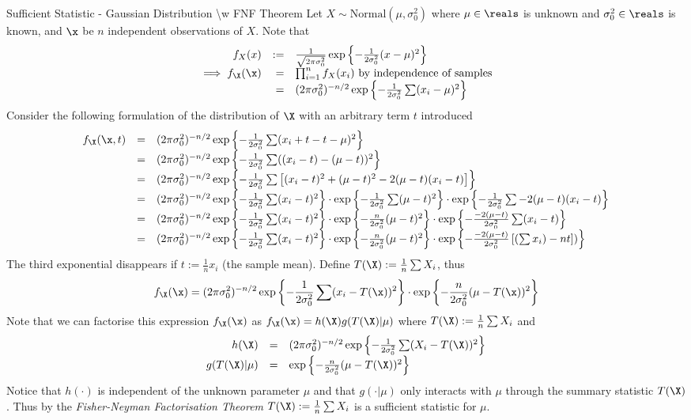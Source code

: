 \documentclass[11pt,a4paper]{article}
\begin{document}
  \begin{example}{Sufficient Statistic - Gaussian Distribution {\textbackslash}w FNF Theorem}
    Let $X\sim\text{Normal}(\mu,\sigma^2_0)$ where $\mu\in\reals$ is unknown and $\sigma^2_0\in\reals$ is known, and $\x$ be $n$ independent observations of $X$. Note that
    \[\begin{array}{rrl}
      f_X(x)&:=&\frac1{\sqrt{2\pi\sigma^2_0}}\exp\left\{-\frac1{2\sigma_0^2}(x-\mu)^2\right\}\\
      \implies f_\X(\x)&=&\prod_{i=1}^nf_X(x_i)\text{ by independence of samples}\\
      &=&(2\pi\sigma_0^2)^{-n/2}\exp\left\{-\frac1{2\sigma_0^2}\sum(x_i-\mu)^2\right\}
    \end{array}\]
    Consider the following formulation of the distribution of $\X$ with an arbitrary term $t$ introduced
    \[\begin{array}{rcl}
      f_\X(\x,t)&=&(2\pi\sigma_0^2)^{-n/2}\exp\left\{-\frac1{2\sigma_0^2}\sum(x_i+t-t-\mu)^2\right\}\\
      &=&(2\pi\sigma_0^2)^{-n/2}\exp\left\{-\frac1{2\sigma_0^2}\sum((x_i-t)-(\mu-t))^2\right\}\\
      &=&(2\pi\sigma_0^2)^{-n/2}\exp\left\{-\frac1{2\sigma_0^2}\sum\left[(x_i-t)^2+(\mu-t)^2-2(\mu-t)(x_i-t)\right]\right\}\\
      &=&(2\pi\sigma_0^2)^{-n/2}\exp\left\{-\frac1{2\sigma_0^2}\sum(x_i-t)^2\right\}\cdot\exp\left\{-\frac1{2\sigma_0^2}\sum(\mu-t)^2\right\}\cdot\exp\left\{-\frac1{2\sigma_0^2}\sum-2(\mu-t)(x_i-t)\right\}\\
      &=&(2\pi\sigma_0^2)^{-n/2}\exp\left\{-\frac1{2\sigma_0^2}\sum(x_i-t)^2\right\}\cdot\exp\left\{-\frac{n}{2\sigma_0^2}(\mu-t)^2\right\}\cdot\exp\left\{-\frac{-2(\mu-t)}{2\sigma_0^2}\sum(x_i-t)\right\}\\
      &=&(2\pi\sigma_0^2)^{-n/2}\exp\left\{-\frac1{2\sigma_0^2}\sum(x_i-t)^2\right\}\cdot\exp\left\{-\frac{n}{2\sigma_0^2}(\mu-t)^2\right\}\cdot\exp\left\{-\frac{-2(\mu-t)}{2\sigma_0^2}\left[\left(\sum x_i\right)-nt\right])\right\}\\
    \end{array}\]
    The third exponential disappears if $t:=\frac1nx_i$ (the sample mean). Define $T(\X):=\frac1n\sum X_i$, thus
    \[ f_\X(\x)=(2\pi\sigma_0^2)^{-n/2}\exp\left\{-\frac1{2\sigma_0^2}\sum(x_i-T(\x))^2\right\}\cdot\exp\left\{-\frac{n}{2\sigma_0^2}(\mu-T(\x))^2\right\} \]
    Note that we can factorise this expression $f_\X(\x)$ as ${f_\X(\x)=h(\X)g(T(\X)|\mu)}$ where ${T(\X):=\frac1n\sum X_i}$ and
    \[\begin{array}{rcl}
      h(\X)&=&(2\pi\sigma_0^2)^{-n/2}\exp\left\{-\frac1{2\sigma_0^2}\sum(X_i-T(\X))^2\right\}\\
      g(T(\X)|\mu)&=&\exp\left\{-\frac{n}{2\sigma_0^2}(\mu-T(\X))^2\right\}
    \end{array}\]
    Notice that $h(\cdot)$ is independent of the unknown parameter $\mu$ and that $g(\cdot|\mu)$ only interacts with $\mu$ through the summary statistic $T(\X)$. Thus by the \textit{Fisher-Neyman Factorisation Theorem} $T(\X):=\frac1n\sum X_i$ is a sufficient statistic for $\mu$.
  \end{example}
\end{document}
